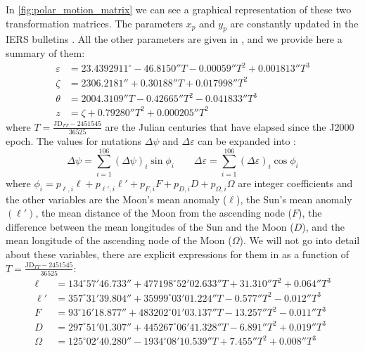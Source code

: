 \documentclass[../main.tex]{subfiles}
\begin{document}
In \cref{fig:polar_motion_matrix} we can see a graphical representation of these two transformation matrices. The parameters $x_p$ and $y_p$ are constantly updated in the IERS bulletins \cite{iersbulletinA}. All the other parameters are given in \cite{lieske}, and we provide here a summary of them:
\begin{align}
  \varepsilon & = 23.4392911^\circ -46.8150''T - 0.00059''T^2 + 0.001813''T^3 \\
  \zeta       & = 2306.2181''+ 0.30188''T + 0.017998''T^2                     \\
  \theta      & = 2004.3109''T- 0.42665''T^2 - 0.041833''T^3                  \\
  z           & = \zeta + 0.79280''T^2+0.000205''T^2
\end{align}
where $T=\frac{\text{JD}_{TT} - 2451545}{36525}$ are the Julian centuries that have elapsed since the J2000 epoch. The values for nutations $\Delta \psi$ and $\Delta \varepsilon$ can be expanded into \cite{montenbruck}:
\begin{equation}
  \Delta\psi = \sum_{i=1}^{106} {(\Delta\psi)}_i\sin \phi_i\qquad \Delta\varepsilon = \sum_{i=1}^{106} {(\Delta\varepsilon)}_i\cos \phi_i
\end{equation}
where $\phi_i=p_{\ell,i}\ell+ p_{\ell',i}\ell'+p_{F,i}F+p_{D,i}D+p_{\Omega,i}\Omega$ are integer coefficients and the other variables are the Moon's mean anomaly ($\ell$), the Sun's mean anomaly $(\ell')$, the mean distance of the Moon from the ascending node ($F$), the difference between the mean longitudes of the Sun and the Moon ($D$), and the mean longitude of the ascending node of the Moon ($\Omega$). We will not go into detail about these variables, there are explicit expressions for them in \cite{montenbruck} as a function of $T=\frac{\text{JD}_{TT} - 2451545}{36525}$:
\begin{align}
  \ell   & = 134^\circ 57' 46.733'' + 477198^\circ 52' 02.633'' T + 31.310'' T^2 + 0.064'' T^3 \\
  \ell'  & = 357^\circ 31' 39.804'' + 35999^\circ 03'01.224'' T - 0.577'' T^2 - 0.012'' T^3    \\
  F      & = 93^\circ 16' 18.877'' + 483202^\circ 01' 03.137'' T - 13.257'' T^2 - 0.011'' T^3  \\
  D      & = 297^\circ 51' 01.307'' + 445267^\circ 06' 41.328'' T - 6.891'' T^2 + 0.019'' T^3  \\
  \Omega & = 125^\circ 02' 40.280'' - 1934^\circ 08' 10.539'' T + 7.455'' T^2 + 0.008'' T^3
\end{align}
\end{document}
